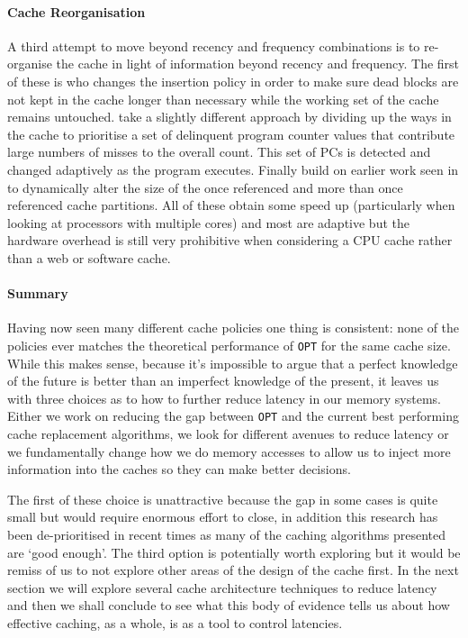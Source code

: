 \paragraph{Cache Reorganisation}

A third attempt to move beyond recency and frequency combinations is to re-organise the cache in light of information beyond recency and frequency. The first of these is \citet{chaudhuriPseudoLIFOFoundationNew2009} who changes the insertion policy in order to make sure dead blocks are not kept in the cache longer than necessary while the working set of the cache remains untouched. \citet{manikantanNUcacheEfficientMulticore2011} take a slightly different approach by dividing up the ways in the cache to prioritise a set of delinquent program counter values that contribute large numbers of misses to the overall count. This set of PCs is detected and changed adaptively as the program executes. Finally \citet{khanDecoupledDynamicCache2012} build on earlier work seen in \citet{johnson2QLowOverhead1994} to dynamically alter the size of the once referenced and more than once referenced cache partitions. All of these obtain some speed up (particularly when looking at processors with multiple cores) and most are adaptive but the hardware overhead is still very prohibitive when considering a CPU cache rather than a web or software cache.

\paragraph{Summary}

Having now seen many different cache policies one thing is consistent: none of the policies ever matches the theoretical performance of \texttt{OPT} for the same cache size. While this makes sense, because it's impossible to argue that a perfect knowledge of the future is better than an imperfect knowledge of the present, it leaves us with three choices as to how to further reduce latency in our memory systems. Either we work on reducing the gap between \texttt{OPT} and the current best performing cache replacement algorithms, we look for different avenues to reduce latency or we fundamentally change how we do memory accesses to allow us to inject more information into the caches so they can make better decisions.

The first of these choice is unattractive because the gap in some cases is quite small but would require enormous effort to close, in addition this research has been de-prioritised in recent times \cite{podlipnigSurveyWebCache2003} as many of the caching algorithms presented are `good enough'. The third option is potentially worth exploring but it would be remiss of us to not explore other areas of the design of the cache first. In the next section we will explore several cache architecture techniques to reduce latency and then we shall conclude to see what this body of evidence tells us about how effective caching, as a whole, is as a tool to control latencies.

